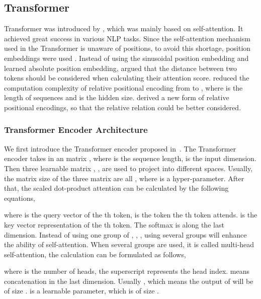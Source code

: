\documentclass[11pt,a4paper]{article}
\begin{document}
\subsection{Transformer}

Transformer was introduced by \citep{vaswani2017attention}, which was mainly based on self-attention. It achieved great success in various NLP tasks. Since the self-attention mechanism used in the Transformer is unaware of positions, to avoid this shortage, position embeddings were used \cite{vaswani2017attention,DBLP:journals/corr/abs-1810-04805}. Instead of using the sinusoidal position embedding \cite{vaswani2017attention} and learned absolute position embedding, \citet{DBLP:conf/naacl/ShawUV18} argued that the distance between two tokens should be considered when calculating their attention score. \citet{DBLP:conf/iclr/HuangVUSHSDHDE19} reduced the computation complexity of relative positional encoding from  to , where  is the length of sequences and  is the hidden size. \citet{DBLP:conf/acl/DaiYYCLS19} derived a new form of relative positional encodings, so that the relative relation could be better considered.




\subsubsection{Transformer Encoder Architecture}

We first introduce the Transformer encoder proposed in~\cite{vaswani2017attention}. The Transformer encoder takes in an matrix , where  is the sequence length,  is the input dimension. Then three learnable matrix , ,  are used to project  into different spaces. Usually, the matrix size of the three matrix are all , where  is a hyper-parameter. After that, the scaled dot-product attention can be calculated by the following equations,

\vspace{-1em}
{\small
  
}where  is the query vector of the th token,  is the token the th token attends.  is the key vector representation of the th token.
The softmax is along the last dimension. Instead of using one group of , , , using several groups will enhance the ability of self-attention. When several groups are used, it is called multi-head self-attention, the calculation can be formulated as follows,

\vspace{-1em}
{\small

}where  is the number of heads, the superscript  represents the head index.  means concatenation in the last dimension. Usually , which means the output of  will be of size .  is a learnable parameter, which is of size .
\end{document}
